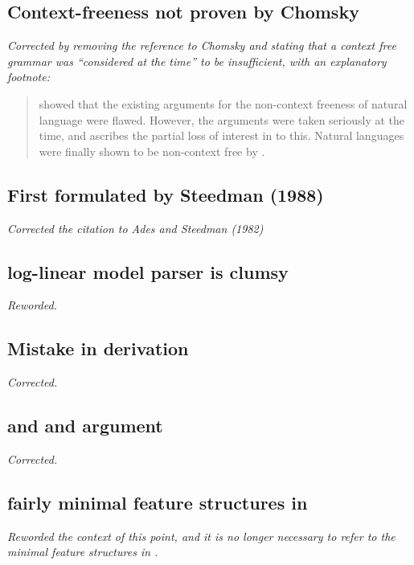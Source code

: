 \subsection{Context-freeness not proven by Chomsky}

\emph{Corrected by removing the reference to Chomsky and stating that a context
free grammar was ``considered at the time'' to be insufficient, with an
explanatory footnote:}

\begin{quote}
\citet{pullum:82} showed that the existing arguments for the non-context
freeness of natural language were flawed. However, the arguments were
taken seriously at the time, and \citet{wood:93} ascribes
the partial loss of interest in \cg to this. Natural languages were finally
shown to be non-context free by \citet{shieber:85}.
\end{quote}

\subsection{First formulated by Steedman (1988)}

\emph{Corrected the citation to Ades and Steedman (1982)}

\subsection{log-linear model parser is clumsy}

\emph{Reworded.}

\subsection{Mistake in derivation}

\emph{Corrected.}

\subsection{and and argument}

\emph{Corrected.}

\subsection{fairly minimal feature structures in \ccgbank}

\emph{Reworded the context of this point, and it is no longer necessary to
refer to the minimal feature structures in \ccgbank.}

